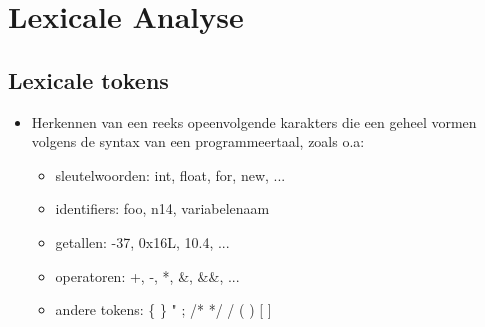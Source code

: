 \chapter{Lexicale Analyse}
\section{Lexicale tokens}
\begin{itemize}
	\item Herkennen van een reeks opeenvolgende karakters die een geheel vormen volgens de syntax van een programmeertaal, zoals o.a:
	\begin{itemize}
		\item sleutelwoorden: int, float, for, new, ...
		\item identifiers: foo, n14, variabelenaam
		\item getallen: -37, 0x16L, 10.4, ...
		\item operatoren: +, -, *, \&, \&\&, ...
		\item andere tokens: \{ \} " ; /*  */ / ( ) [ ]
	\end{itemize}

\end{itemize}